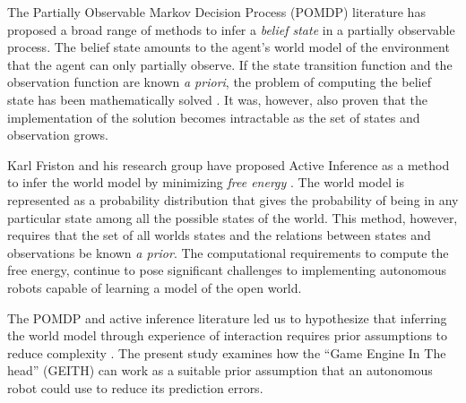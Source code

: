 \documentclass[runningheads]{llncs}
\begin{document}
The Partially Observable Markov Decision Process (POMDP) literature has proposed a broad range of methods to infer a \textit{belief state} in a partially observable process.
The belief state amounts to the agent's world model of the environment that the agent can only partially observe.  
If the state transition function and the observation function are known \textit{a priori}, the problem of computing the belief state has been mathematically solved \cite{astrom1965optimal}. 
It was, however, also proven that the implementation of the solution becomes intractable as the set of states and observation grows. 

Karl Friston and his research group have proposed Active Inference \cite[e.g.]{smith_step-by-step_2022} as a method to infer the world model by minimizing \textit{free energy} \cite{friston_free-energy_2010}.
The world model %
is represented as a probability distribution %
that gives the probability of being in any particular state 
among all the possible states of the world. 
This method, however, requires that the set of all worlds states %
and the relations between states and observations 
be known \textit{a prior}. 
The computational requirements to compute the free energy, continue to pose significant challenges to implementing autonomous robots capable of learning a model of the open world.

The POMDP and active inference literature led us to hypothesize that inferring the world model through experience of interaction requires prior assumptions to reduce complexity \cite{georgeon_artificial_2024}. 
The present study examines how the ``Game Engine In The head'' (GEITH) can work as a suitable prior assumption that an autonomous robot could use to reduce its prediction errors. 
\end{document}
